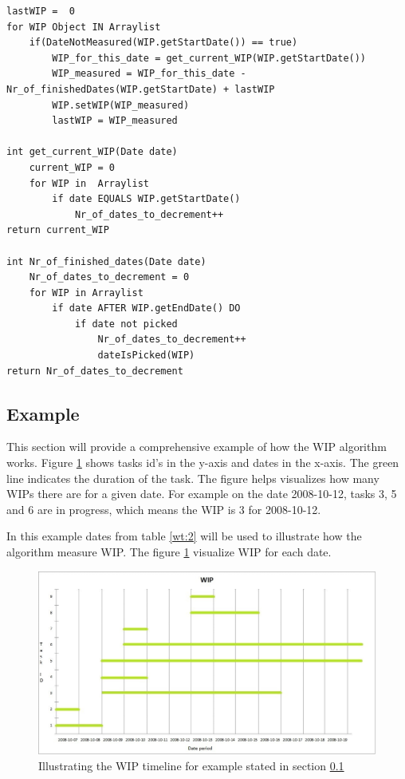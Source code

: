 \documentclass[UKenglish]{ifimaster}  %
\begin{document}
\begin{minipage}{\textwidth} 
\begin{lstlisting}[caption={WIP measurement},label={lst:measure}]
lastWIP =  0
for WIP Object IN Arraylist	
	if(DateNotMeasured(WIP.getStartDate()) == true)
		WIP_for_this_date = get_current_WIP(WIP.getStartDate())  
		WIP_measured = WIP_for_this_date - Nr_of_finishedDates(WIP.getStartDate) + lastWIP
		WIP.setWIP(WIP_measured)
		lastWIP = WIP_measured 

int get_current_WIP(Date date)
	current_WIP = 0
	for WIP in  Arraylist
		if date EQUALS WIP.getStartDate()
			Nr_of_dates_to_decrement++
return current_WIP
			 	
int Nr_of_finished_dates(Date date)
	Nr_of_dates_to_decrement = 0
	for WIP in Arraylist
		if date AFTER WIP.getEndDate() DO
			if date not picked
				Nr_of_dates_to_decrement++
				dateIsPicked(WIP)				
return Nr_of_dates_to_decrement 
 \end{lstlisting}
  \end{minipage}

\subsection{Example}
\label{sec:Example}
This section will provide a comprehensive example of how the WIP algorithm works.  
Figure \ref{wip_timeline}  shows tasks id's in the y-axis and dates in the x-axis. The green line indicates the duration of the task. The figure helps  visualizes how many WIPs there are for a given date. For example on the date 2008-10-12, tasks 3, 5 and 6 are in progress, which means the WIP is 3 for 2008-10-12.  

In this example dates from table \ref{wt:2}  will be used to illustrate how the algorithm measure WIP.  The figure \ref{wip_timeline} visualize WIP for each date.
\begin{figure}[ht!]
\centering
\hspace*{-1in}
\includegraphics[width=21cm,trim=4 4 4 4,clip]{Picture/wip_example.jpg}
\caption{Illustrating the WIP timeline for example stated in section \ref{sec:Example}}
\label{wip_timeline}
\end{figure}
\end{document}
